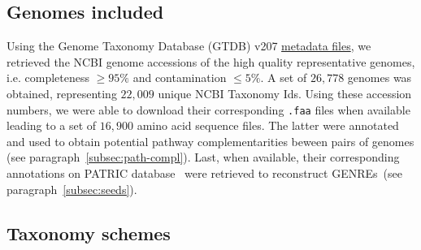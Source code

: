 \documentclass[sn-mathphys,Numbered, lineno]{sn-jnl}  %
\theoremstyle{thmstyleone}%
\theoremstyle{thmstyletwo}%
\theoremstyle{thmstylethree}%
\begin{document}
    \subsection*{Genomes included}
    \label{subsec:genomes}

        Using the Genome Taxonomy Database (GTDB) v207 \href{https://data.gtdb.ecogenomic.org/releases/release207/207.0/}{metadata files}, we retrieved the NCBI genome accessions of the high quality representative genomes, i.e. completeness $\geq 95\%$  and contamination $\leq 5\%$.
        A set of $26,778$ genomes was obtained, representing $22,009$ unique NCBI Taxonomy Ids.
        Using these accession numbers, we were able to download their corresponding \texttt{.faa} files when available 
        leading to a set of $16,900$ amino acid sequence files.
        The latter were annotated and used to obtain potential pathway complementarities beween pairs of genomes (see paragraph~\ref{subsec:path-compl}).
        Last, when available, their corresponding annotations on PATRIC database~\cite{wattam2017improvements} were retrieved to reconstruct GENREs~(see paragraph~\ref{subsec:seeds}).


    \subsection*{Taxonomy schemes}
    \label{subsec:taxonomies}
\end{document}
